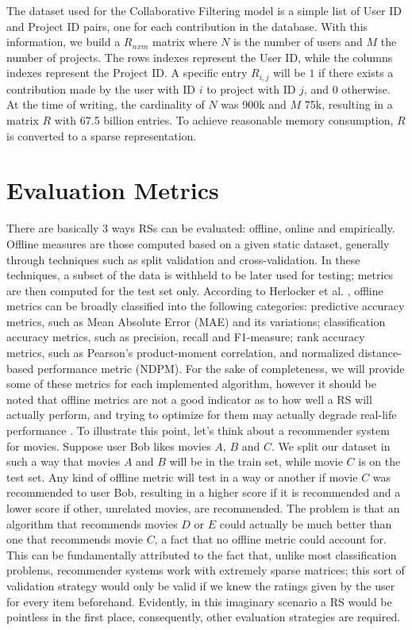 \documentclass[cic,tc,english]{iiufrgs}
\begin{document}
The dataset used for the Collaborative Filtering model is a simple list of User ID and Project ID pairs, one for each contribution in the database. With this information, we build a \(R_{nxm}\) matrix where $N$ is the number of users and $M$ the number of projects. The rows indexes represent the User ID, while the columns indexes represent the Project ID. A specific entry $R_{i,j}$ will be $1$ if there exists a contribution made by the user with ID $i$ to project with ID $j$, and $0$ otherwise. At the time of writing, the cardinality of $N$ was 900k and $M$ 75k, resulting in a matrix $R$ with 67.5 billion entries. To achieve reasonable memory consumption, $R$ is converted to a sparse representation.

\section{Evaluation Metrics}
There are basically 3 ways RSs can be evaluated: offline, online and empirically. Offline measures are those computed based on a given static dataset, generally through techniques such as split validation and cross-validation. In these techniques, a subset of the data is withheld to be later used for testing; metrics are then computed for the test set only. According to Herlocker et al. \cite{Herlocker2004}, offline metrics can be broadly classified into the following categories: predictive accuracy metrics, such as Mean Absolute Error (MAE) and its variations; classification accuracy metrics, such as precision, recall and F1-measure; rank accuracy metrics, such as Pearson’s product-moment correlation, and normalized distance-based performance metric (NDPM). For the sake of completeness, we will provide some of these metrics for each implemented algorithm, however it should be noted that offline metrics are not a good indicator as to how well a RS will actually perform, and trying to optimize for them may actually degrade real-life performance \cite{McNee2006}. To illustrate this point, let's think about a recommender system for movies. Suppose user Bob likes movies $A$, $B$ and $C$. We split our dataset in such a way that movies $A$ and $B$ will be in the train set, while movie $C$ is on the test set. Any kind of offline metric will test in a way or another if movie $C$ was recommended to user Bob, resulting in a higher score if it is recommended and a lower score if other, unrelated movies, are recommended. The problem is that an algorithm that recommends movies $D$ or $E$ could actually be much better than one that recommends movie $C$, a fact that no offline metric could account for. This can be fundamentally attributed to the fact that, unlike most classification problems, recommender systems work with extremely sparse matrices; this sort of validation strategy would only be valid if we knew the ratings given by the user for every item beforehand. Evidently, in this imaginary scenario a RS would be pointless in the first place, consequently, other evaluation strategies are required.
\end{document}
